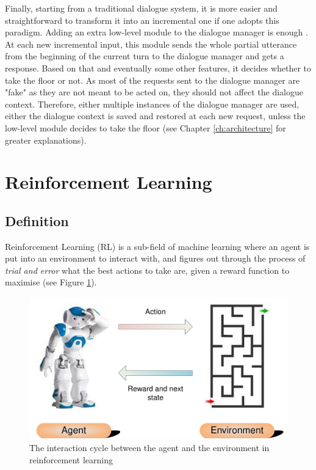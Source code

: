 				Finally, starting from a traditional dialogue system, it is more easier and straightforward to transform it into an incremental one if one adopts this paradigm. Adding an extra low-level module to the dialogue manager is enough \cite{Selfridge2012a,Khouzaimi2014a}. At each new incremental input, this module sends the whole partial utterance from the beginning of the current turn to the dialogue manager and gets a response. Based on that and eventually some other features, it decides whether to take the floor or not. As most of the requests sent to the dialogue manager are "fake" as they are not meant to be acted on, they should not affect the dialogue context. Therefore, either multiple instances of the dialogue manager are used, either the dialogue context is saved and restored at each new request, unless the low-level module decides to take the floor (see Chapter \ref{ch:architecture} for greater explanations).

\section{Reinforcement Learning}
\label{soa:rl}
	\subsection{Definition}
    
    	Reinforcement Learning (RL) is a sub-field of machine learning where an agent is put into an environment to interact with, and figures out through the process of \textit{trial and error} what the best actions to take are, given a reward function to maximise \cite{Sutton1998} (see Figure \ref{fig:rlscheme}).
        
        \begin{figure}[ht]
          \centering
          \includegraphics[scale=0.8]{figures/AgentEnv.pdf}
          \caption{The interaction cycle between the agent and the environment in reinforcement learning}
          \label{fig:rlscheme}
        \end{figure}
        
